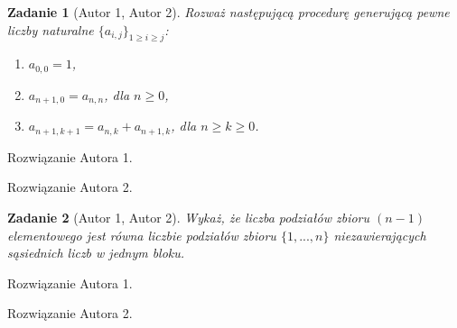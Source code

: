 \documentclass{mwart}
\newtheorem{zad}{Zadanie}[section]
\begin{document}
\begin{zad}[Autor 1, Autor 2]
    Rozważ  następującą procedurę generującą pewne liczby naturalne
    $\{a_{i,j}\}_{1 \geq i \geq j}$:
    \begin{enumerate}
        \item $a_{0,0} = 1$,
        \item $a_{n+1, 0} = a_{n,n}$, dla $n \geq 0$,
        \item $a_{n+1, k+1} = a_{n, k} + a_{n+1, k}$, dla $n \geq k \geq 0$.
    \end{enumerate}
\end{zad}
\begin{mdframed}
    Rozwiązanie Autora 1.
\end{mdframed}
\begin{mdframed}
    Rozwiązanie Autora 2.
\end{mdframed}




\begin{zad}[Autor 1, Autor 2]
    Wykaż, że liczba podziałów zbioru $(n - 1)$  elementowego jest równa
    liczbie podziałów zbioru $\{1, ..., n\}$ niezawierających sąsiednich liczb w jednym bloku.
\end{zad}
\begin{mdframed}
    Rozwiązanie Autora 1.
\end{mdframed}
\begin{mdframed}
    Rozwiązanie Autora 2.
\end{mdframed}
\end{document}
